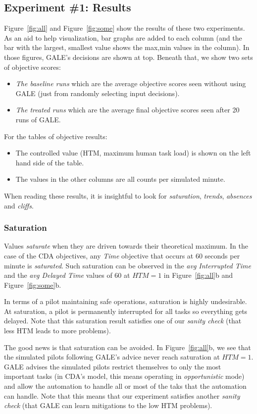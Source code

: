 \documentclass[journal]{IEEEtran}
\newcommand{\bi}{\begin{itemize}}
\newcommand{\ei}{\end{itemize}}
\newcommand{\fig}[1]{Figure~\ref{fig:#1}}
\begin{document}
\subsection{Experiment \#1: Results}
\fig{all} and \fig{some} show the results of these two experiments.
As an aid to help visualization, bar graphs are added to each column (and the bar with the largest, smallest value shows the max,min values in the column).
In those figures, GALE's decisions are shown at top.
Beneath that, we show two sets of objective scores:
\bi
\item {\em The baseline runs} which are the average objective scores seen without using GALE (just from randomly selecting input decisions).
\item {\em The treated runs} which are the average final objective scores seen after 20 runs of GALE.
\ei
For the tables of objective results:
\bi
\item The controlled value (HTM, maximum human task load) is shown on the left hand side of the table.
\item The values in the other columns are all counts per simulated minute.
\ei
When reading these results, it is insightful to look for {\em saturation}, {\em trends}, {\em absences} and {\em cliffs}. 


\subsubsection{Saturation}

Values {\em saturate} when they are driven towards their theoretical maximum. 
In the case of the CDA objectives, any {\em Time} objective that occurs at 60 seconds per minute is {\em saturated}. 
Such saturation can be observed in the {\em avg Interrupted Time} and the {\em avg Delayed Time} values of 60 at  $\mathit{HTM}=1$ in \fig{all}b and \fig{some}b.

In terms of a pilot maintaining safe operations, saturation is highly undesirable. At saturation, a pilot is permanently interrupted for all tasks so everything gets delayed.  
Note that this saturation result satisfies  one of our {\em sanity check} (that less HTM leads to more problems).

The good news is that saturation can be avoided. 
In \fig{all}b, we see that the simulated pilots following GALE's advice never
reach saturation at $\mathit{HTM}=1$.
GALE advises the simulated pilots restrict themselves to only the most important tasks (in CDA's model, this means operating in {\em opportunistic} mode) and allow the automation to handle all or most of the taks that the automation can handle.
Note that this  means that our experiment satisfies  another {\em sanity check} (that GALE can learn mitigations to the low HTM problems).
\end{document}

